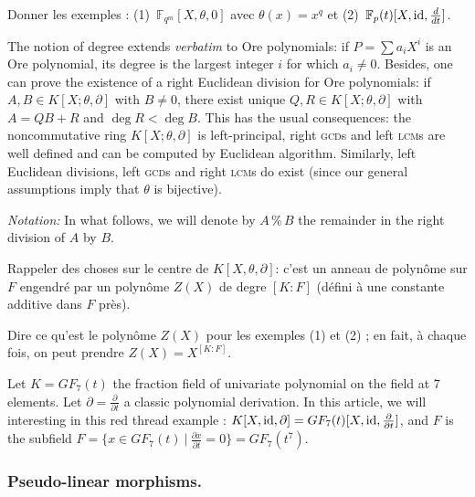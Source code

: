\documentclass[a4paper]{llncs}
\def\todo#1{{\color{todo} #1}}
\newcommand{\FF}{\mathbb F}
\newcommand{\id}{\textrm{\rm id}}
\renewcommand{\mod}{\,\%\,}
\begin{document}
\begin{example}
\todo{Donner les exemples :
(1)~$\FF_{q^m}[X,\theta,0]$ avec $\theta(x) = x^q$ et
(2)~$\FF_p(t)[X,\id,\frac d{dt}]$.}
\end{example}

The notion of degree extends \emph{verbatim} to Ore polynomials: if $P = 
\sum a_iX^i$ is an Ore polynomial, its degree is the largest integer $i$ 
for which $a_i \neq 0$.
Besides, one can prove the existence of a right Euclidean division for 
Ore polynomials: if $A, B \in K[X;\theta,\partial]$ with $B \neq 0$, 
there exist unique $Q, R \in K[X;\theta,\partial]$ with $A = QB+R$ and 
$\deg R < \deg B$. This has the usual consequences: the noncommutative
ring $K[X;\theta,\partial]$ is left-principal, right \textsc{gcd}s and
left \textsc{lcm}s are well defined and can be computed by Euclidean
algorithm. 
Similarly, left Euclidean divisions, left \textsc{gcd}s and right 
\textsc{lcm}s do exist (since our general assumptions imply that
$\theta$ is bijective).

\medskip

\noindent
\textit{Notation:}
In what follows, we will denote by $A \mod B$ the remainder in the 
right division of $A$ by $B$.

\todo{Rappeler des choses sur le centre de $K[X,\theta,\partial]$:
c'est un anneau de polynôme sur $F$ engendré par un polynôme $Z(X)$
de degre $[K:F]$ (défini à une constante additive dans $F$ près).}

\begin{example}
\todo{Dire ce qu'est le polynôme $Z(X)$ pour les exemples (1) et (2) ; 
en fait, à chaque fois, on peut prendre $Z(X) = X^{[K:F]}$.}
\end{example}

\begin{example}
Let $K = GF_7(t)$ the fraction field of univariate polynomial on the 
field at 7 elements. Let $\partial = \frac{\partial}{\partial t}$ a 
classic polynomial derivation. In this article, we will interesting in 
this red thread example : $K[X, \id, \partial] = GF_7(t)[X, \id, 
\frac{\partial}{\partial t}]$, and $F$ is the subfield $F = \{x \in 
GF_7(t) \ | \ \frac{\partial x}{\partial t} = 0\} = GF_7(t^7)$.
\end{example}

\subsubsection*{Pseudo-linear morphisms.}
\end{document}

